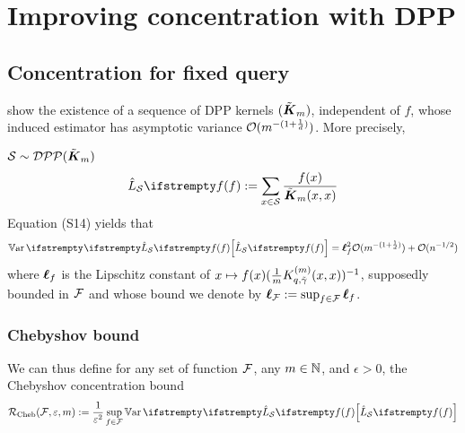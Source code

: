 

\chapter{Improving concentration with DPP}
\section{Concentration for fixed query}

\cite{bardenet2021sgddpp} show the existence of a sequence of DPP kernels $(\tilde{\boldsymbol K}_{m})$, independent of $f$, whose induced estimator has asymptotic variance $\mathcal{O}( m ^{-(1+\frac 1 d)})$. More precisely, 

\begin{tcolorbox}
	\begin{theorem}
		$\mathcal{S} \sim  \mathcal{DPP}(\tilde{\boldsymbol K}_{m})$
		\begin{equation}
			\estloss{\mathcal{S}}{\query} := \sum_{x \in \mathcal{S}} \frac{f(x)}{\opekernel{m}(x,x)}
		\end{equation}
		Equation (S14) yields that 
		\begin{equation}
			\Var{}{\estloss{\mathcal{S}}{\query}} = \lipschitz^2_\query \OO( m ^{-(1+\frac 1 d)}) +\OO( n^{-1/2})
		\end{equation}
		where $\boldsymbol\ell_f$ is the Lipschitz constant of $x \mapsto f(x) (\frac{1}{m} K^{(m)}_{q, \tilde \gamma}(x,x))^{-1}$, supposedly bounded in $\mathcal{F}$ and whose bound we denote by $\boldsymbol\ell_{\mathcal{F}} := \sup_{f \in \mathcal{F}}\boldsymbol\ell_f$.
	\end{theorem}
\end{tcolorbox}


\subsection{Chebyshov bound}

We can thus define for any set of function $\mathcal{F}$, any $m\in \mathbb{N}$, and $\epsilon>0$, the Chebyshov concentration bound
\begin{equation*}
	\label{def_boundratecheb}
	\boundrate_{\textrm{Cheb}}(\queryset, \epsilon, m) := \frac{1}{\epsilon^2} \sup_{\query \in \queryset} \Var{}{\estloss{\mathcal{S}}{\query}}
\end{equation*}



